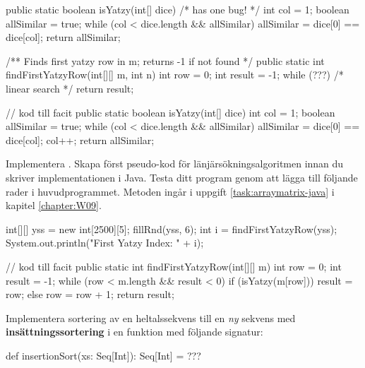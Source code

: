\begin{Code}[language=Java]
    public static boolean isYatzy(int[] dice){ /* has one bug! */
        int col = 1;
        boolean allSimilar = true;
        while (col < dice.length && allSimilar) {
          allSimilar = dice[0] == dice[col];
        }
        return allSimilar;
    }
    
    /** Finds first yatzy row in m; returns -1 if not found */
    public static int findFirstYatzyRow(int[][] m, int n){
        int row = 0;
        int result = -1;
        while (???) {
             /* linear search  */ 
        }
        return result;
    }
\end{Code}


\begin{Code}[language=Java]
// kod till facit
    public static boolean isYatzy(int[] dice){
        int col = 1;
        boolean allSimilar = true;
        while (col < dice.length && allSimilar) {
          allSimilar = dice[0] == dice[col];
          col++;
        }
        return allSimilar;
    }
\end{Code}


\Subtask Implementera . Skapa först pseudo-kod för länjärsökningsalgoritmen innan du skriver implementationen i Java. 
Testa ditt program genom att lägga till följande rader i huvudprogrammet. 
Metoden  ingår i uppgift \ref{task:arraymatrix-java} i kapitel \ref{chapter:W09}.
\begin{Code}[language=Java]
        int[][] yss = new int[2500][5];
        fillRnd(yss, 6);
        int i = findFirstYatzyRow(yss);
        System.out.println("First Yatzy Index: " + i);
\end{Code}




\begin{Code}[language=Java]
// kod till facit
    public static int findFirstYatzyRow(int[][] m){
        int row = 0;
        int result = -1;
        while (row < m.length && result < 0){
            if (isYatzy(m[row])) {
              result = row;
            } else {
              row = row + 1;    
            }
        }
        return result;
    }
\end{Code}



\Task Implementera sortering av en heltalssekvens till en \emph{ny} sekvens med \textbf{insättningssortering}  i en funktion med följande signatur:
\begin{Code}
def insertionSort(xs: Seq[Int]): Seq[Int] = ??? 
\end{Code}


